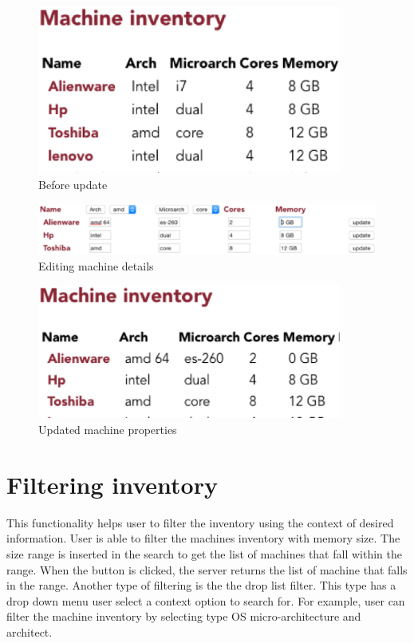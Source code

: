 \begin{figure}[h]
  \includegraphics[width=100mm, scale=0.5]{update.eps}
  \caption{Before update}
  \label{update}
\end{figure}
\begin{figure}[h]
  \includegraphics[width=\linewidth]{change.eps}
  \caption{Editing machine details}
   \label{change}
\end{figure}
\begin{figure}[h]
  \includegraphics[width=100mm, scale=0.5]{update2.eps}
  \caption{Updated machine properties}
  \label{update2}
\end{figure}

\pagebreak
\section*{Filtering inventory}
This functionality helps user to filter the inventory using the context of desired information. User is able to filter the machines inventory with memory size. The size range is inserted in the search to get the list of machines that fall within the range. When the button is clicked, the  server returns the list of machine that falls in the range. Another type of filtering is the the drop list filter. This type has a drop down menu user select a context option to search for. For example, user can filter the machine inventory by selecting type OS micro-architecture and architect.
\pagebreak
\pagebreak
